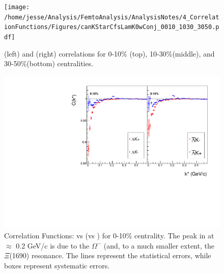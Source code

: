 \documentclass[/home/jesse/Analysis/FemtoAnalysis/AnalysisNotes/AnalysisNoteJBuxton.tex]{subfiles}
\begin{document}
\begin{figure}[h]
  \centering
  \texttt{[image: /home/jesse/Analysis/FemtoAnalysis/AnalysisNotes/4\_CorrelationFunctions/Figures/canKStarCfsLamK0wConj\_0010\_1030\_3050.pdf]}
  \caption[\LamKs \& \ALamKs Correlation Functions]
  {
  \LamKs (left) and \ALamKs (right) correlations for 0-10\% (top), 10-30\%(middle), and 30-50\%(bottom) centralities.
  }
  \label{fig:AllCfs:c}
\end{figure}


\begin{figure}[h]
  \centering
  \includegraphics[width=\textwidth]{4_CorrelationFunctions/Figures/canLamKchPvsLamKchM0010.pdf}
  \caption[Correlation Functions: \LamKchP vs \LamKchM for 0-10\% Centrality]{Correlation Functions: \LamKchP vs \LamKchM (\ALamKchP vs \ALamKchM) for 0-10\% centrality.  The peak in \LamKchMALamKchP at \kstar $\approx$ 0.2 GeV/c is due to the $\Omega^{-}$ (and, to a much smaller extent, the $\Xi$(1690) resonance.  The lines represent the statistical errors, while boxes represent systematic errors.}
  \label{fig:cLamcKchCfs0010}
\end{figure}

\clearpage
\end{document}

